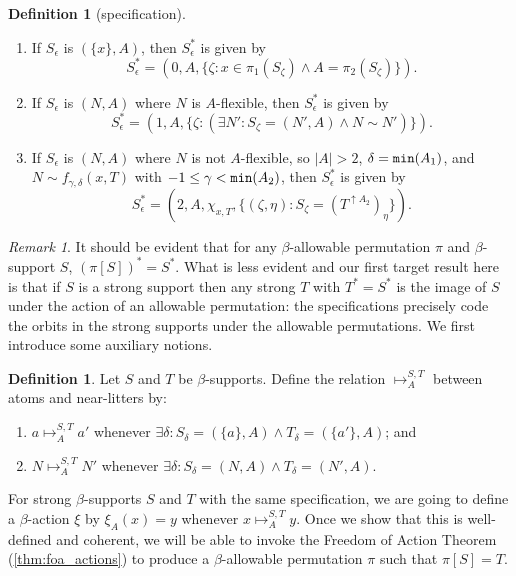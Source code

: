 \documentclass{article}
\theoremstyle{definition}
\newtheorem{definition}[theorem]{Definition}
\theoremstyle{remark}
\newtheorem{remark}[theorem]{Remark}
\begin{document}
{\begin{definition}[specification]
\begin{enumerate}

\item If $S_\epsilon$ is $(\{x\},A)$, then $S^*_\epsilon$ is given by
$$ S^*_\epsilon = (0, A, \{ \zeta : x \in \pi_1(S_\zeta) \wedge A = \pi_2(S_\zeta) \}). $$
\item If $S_\epsilon$ is $(N,A)$ where $N$ is $A$-flexible, then $S^*_\epsilon$ is given by
$$ S^*_\epsilon = (1, A, \{ \zeta : (\exists N' : S_\zeta = (N',A) \wedge N \sim N') \} ). $$
\item If $S_\epsilon$ is $(N,A)$ where $N$ is not $A$-flexible, so $|A| > 2$, $\delta = {\tt min}(A_1)$, and $N \sim f_{\gamma,\delta}(x,T)$ with $-1\leq\gamma<{\tt min}(A_2)$, then $S^*_\epsilon$ is given by
$$ S^*_\epsilon = (2, A, \chi_{x,T}, \{ ( \zeta, \eta ) : S_\zeta = (T^{\uparrow A_2})_\eta \} ). $$

\end{enumerate}
\end{definition}

\begin{remark}
It should be evident that for any $\beta$-allowable permutation $\pi$ and $\beta$-support $S$, $(\pi[S])^* = S^*$.  What is less evident and our first target result here is that if $S$ is a strong support then any strong $T$ with $T^* = S^*$ is the image of $S$ under the action of an allowable permutation:  the specifications precisely code the orbits in the strong supports under the allowable permutations.
We first introduce some auxiliary notions.
\end{remark}

\begin{definition}
  Let $S$ and $T$ be $\beta$-supports.
  Define the relation $\mapsto^{S,T}_A$ between atoms and near-litters by:
  \begin{enumerate}
    \item $a \mapsto^{S,T}_A a'$ whenever $\exists \delta : S_\delta = (\{a\}, A) \wedge T_\delta = (\{a'\}, A)$; and
    \item $N \mapsto^{S,T}_A N'$ whenever $\exists \delta : S_\delta = (N, A) \wedge T_\delta = (N', A)$.
  \end{enumerate}
\end{definition}

For strong $\beta$-supports $S$ and $T$ with the same specification, we are going to define a $\beta$-action $\xi$ by $\xi_A(x) = y$ whenever $x \mapsto^{S,T}_A y$.
Once we show that this is well-defined and coherent, we will be able to invoke the Freedom of Action Theorem (\ref{thm:foa_actions}) to produce a $\beta$-allowable permutation $\pi$ such that $\pi[S] = T$.

}
\end{document}
